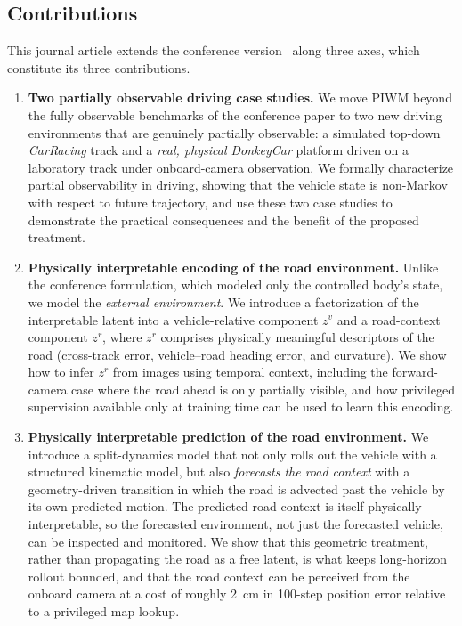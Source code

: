 \documentclass[preprint,12pt]{elsarticle}
\newcommand{\zv}{z^{v}}      %
\newcommand{\zr}{z^{r}}      %
\begin{document}
\subsection*{Contributions}

This journal article extends the conference version~\cite{piwm_conf}
along three axes, which constitute its three contributions.

\begin{enumerate}
    \item \textbf{Two partially observable driving case studies.}
    We move PIWM beyond the fully observable benchmarks of the conference paper
    to two new driving environments that are genuinely partially observable:
    a simulated top-down \emph{CarRacing} track and a \emph{real, physical
    DonkeyCar} platform driven on a laboratory track under onboard-camera
    observation.
    We formally characterize partial observability in driving, showing that the
    vehicle state is non-Markov with respect to future trajectory, and use these
    two case studies to demonstrate the practical consequences and the benefit of
    the proposed treatment.

    \item \textbf{Physically interpretable encoding of the road environment.}
    Unlike the conference formulation, which modeled only the controlled body's
    state, we model the \emph{external environment}.
    We introduce a factorization of the interpretable latent into a
    vehicle-relative component $\zv$ and a road-context component $\zr$, where
    $\zr$ comprises physically meaningful descriptors of the road (cross-track
    error, vehicle--road heading error, and curvature).
    We show how to infer $\zr$ from images using temporal context, including the
    forward-camera case where the road ahead is only partially visible, and how
    privileged supervision available only at training time can be used to learn
    this encoding.

    \item \textbf{Physically interpretable prediction of the road environment.}
    We introduce a split-dynamics model that not only rolls out the vehicle with
    a structured kinematic model, but also \emph{forecasts the road context} with
    a geometry-driven transition in which the road is advected past the vehicle
    by its own predicted motion.
    The predicted road context is itself physically interpretable, so the
    forecasted environment, not just the forecasted vehicle, can be inspected and
    monitored.
    We show that this geometric treatment, rather than propagating the road as a
    free latent, is what keeps long-horizon rollout bounded, and that the road
    context can be perceived from the onboard camera at a cost of roughly
    \SI{2}{cm} in \num{100}-step position error relative to a privileged map
    lookup.
\end{enumerate}
\end{document}
